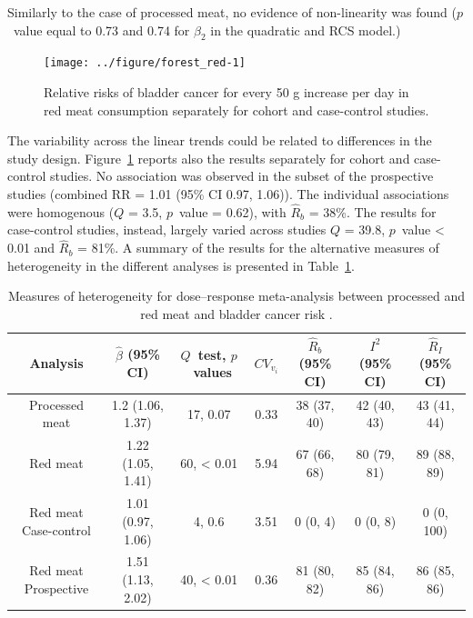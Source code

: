 \documentclass[11pt,a4paper,twoside,openany]{book}\usepackage{knitr}
\begin{document}
{\noindent Similarly to the case of processed meat, no evidence of non-linearity was found ($p$~value equal to 0.73 and 0.74 for $\beta_2$ in the quadratic and RCS model.)

\begin{knitrout}\footnotesize
{}\color{fgcolor}\begin{figure}[ht!]

{\centering \texttt{[image: ../figure/forest\_red-1]} 

}

\caption[Relative risks of bladder cancer for every 50 g increase per day in red meat consumption separately for cohort and case-control studies]{Relative risks of bladder cancer for every 50 g increase per day in red meat consumption separately for cohort and case-control studies.}\label{fig:forest_red}
\end{figure}


\end{knitrout}

The variability across the linear trends could be related to differences in the study design. Figure~\ref{fig:forest_red} reports also the results separately for cohort and case-control studies. No association was observed in the subset of the prospective studies (combined RR = 1.01 (95\% CI 0.97, 1.06)). The individual associations were homogenous ($Q $ = 3.5, $p$~value = 0.62), with $\hat R_b$ = 38\%. The results for case-control studies, instead, largely varied across studies $Q $ = 39.8, $p$~value < 0.01 and $\hat R_b$ = 81\%. A summary of the results for the alternative measures of heterogeneity in the different analyses is presented in Table~\ref{tab:tab_rb}.

\begin{table}[!h]

\caption{\label{tab:tab_rb}Measures of heterogeneity for dose--response meta-analysis between processed and red meat and bladder cancer risk \citep{crippa2016red}.}
\centering
\fontsize{9}{11}\selectfont
\begin{tabular}[t]{ccccccc}
\toprule
Analysis & $\hat \beta$ (95\% CI) & $Q$~test, $p$~values & $CV_{v_i}$ & $\hat R_b$ (95\% CI) & $I^2$ (95\% CI) & $\hat R_I$ (95\% CI)\\
\midrule
Processed meat & 1.2 (1.06, 1.37) & 17, 0.07 & 0.33 & 38 (37, 40) & 42 (40, 43) & 43 (41, 44)\\
Red meat & 1.22 (1.05, 1.41) & 60, < 0.01 & 5.94 & 67 (66, 68) & 80 (79, 81) & 89 (88, 89)\\
Red meat Case-control & 1.01 (0.97, 1.06) & 4, 0.6 & 3.51 & 0 (0, 4) & 0 (0, 8) & 0 (0, 100)\\
Red meat Prospective & 1.51 (1.13, 2.02) & 40, < 0.01 & 0.36 & 81 (80, 82) & 85 (84, 86) & 86 (85, 86)\\
\bottomrule
\end{tabular}
\end{table}










}
\end{document}
